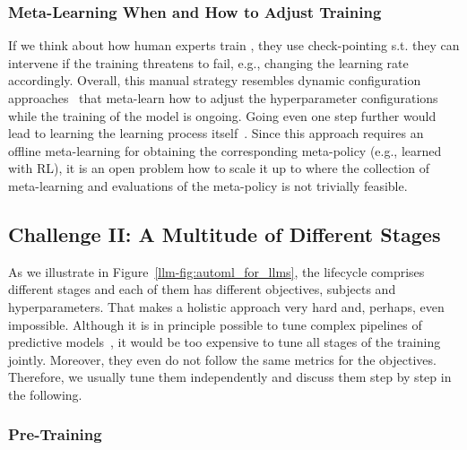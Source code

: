 \subsubsection{Meta-Learning When and How to Adjust Training}

If we think about how human experts train \LLMs, they use check-pointing s.t. they can intervene if the training threatens to fail, e.g., changing the learning rate accordingly. Overall, this manual strategy resembles dynamic configuration approaches~\cite{adriaensen-jair22a} that meta-learn how to adjust the hyperparameter configurations while the training of the model is ongoing. 
Going even one step further would lead to learning the learning process itself~\cite{andrychowicz-neurips16a,chen-neurips22a}.
Since this approach requires an offline meta-learning for obtaining the corresponding meta-policy (e.g., learned with RL), it is an open problem how to scale it up to \LLMs where the collection of meta-learning and evaluations of the meta-policy is not trivially feasible.


\subsection{Challenge II: A Multitude of Different Stages}


As we illustrate in Figure~\ref{llm-fig:automl_for_llms}, the \LLM lifecycle comprises different stages and each of them has different objectives, subjects and hyperparameters. That makes a holistic \AutoML approach very hard and, perhaps, even impossible. Although it is in principle possible to tune complex pipelines of predictive models~\cite{wachsmuth-cicl13a,feurer-nips15a,wever-automl18a,olson-automl19a}, it would be too expensive to tune all stages of the \LLM training jointly. Moreover, they even do not follow the same metrics for the objectives. Therefore, we usually tune them independently and discuss them step by step in the following.

\subsubsection{Pre-Training}

